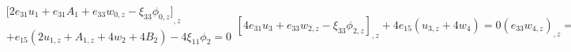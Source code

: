 \documentclass[12pt,sort&compress,fleqn,3p]{elsarticle}
\newcommand{\qiudao}[3]{ {#1} _ {{#2} , {#3}} }
\newcommand{\er}[4]{{#1}_{#2}{#3}_{#4}}
\newcommand{\de}[5]{{#1}_{#2}{#3}_{{#4},{#5}}}
\begin{document}
\begin{subequations}
\begin{equation}
\begin{split}
&\qiudao{\big[2e_{31}u_{1}+e_{31}A_{1}+e_{33}w_{0,z}-\de{\xi}{33}{\phi}{0}{z}\big]}{}{z}\\
&+e_{15}(2u_{1,z}+A_{1,z}+4w_{2}+4B_{2})-4\er{\xi}{11}{\phi}{2}=0
\end{split}
\end{equation}
\begin{equation}\label{labeq_system_11}
\qiudao{[4\er{e}{31}{u}{3}+\de{e}{33}{w}{2}{z}-\de{\xi}{33}{\phi}{2}{z}]}{}{z}+4e_{15}(u_{3,z}+4w_{4})=0
\end{equation}
\begin{equation}\label{labeq_system_12}
(e_{33}w_{4,z})_{,z}=0
\end{equation}
\begin{equation}\label{labeq_system_13}
\qiudao{[2\er{e}{31}{A}{1}+\de{e}{33}{B}{0}{z}-\de{\xi}{33}{C}{0}{z}]}{}{z}+2e_{15}A_{1,z}+4e_{15}B_{2}=0
\end{equation}
\begin{equation}\label{labeq_system_14}
(e_{33}B_{2,z})_{,z}=0
\end{equation}
\end{subequations}
\end{document}
